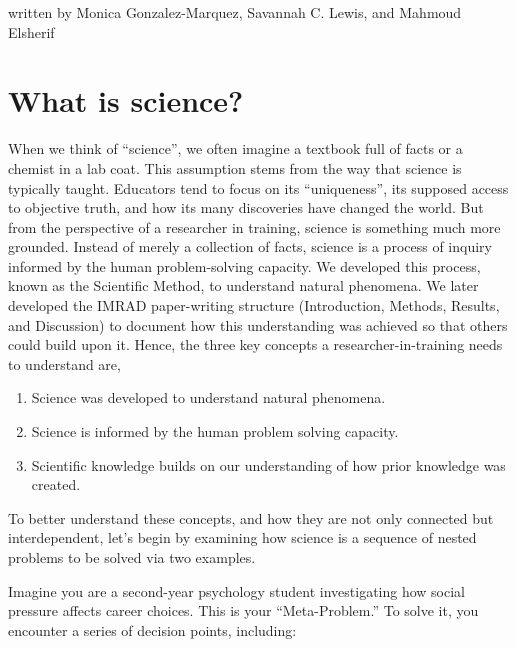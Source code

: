 \documentclass[
  letterpaper,
]{book}
\providecommand{\tightlist}{%
  \setlength{\itemsep}{0pt}\setlength{\parskip}{0pt}}\usepackage{longtable,booktabs,array}
\begin{document}
{written by Monica Gonzalez-Marquez, Savannah C. Lewis, and Mahmoud
Elsherif}

\section*{What is science?}\label{what-is-science}


When we think of ``science'', we often imagine a textbook full of facts
or a chemist in a lab coat. This assumption stems from the way that
science is typically taught. Educators tend to focus on its
``uniqueness'', its supposed access to objective truth, and how its many
discoveries have changed the world. But from the perspective of a
researcher in training, science is something much more grounded. Instead
of merely a collection of facts, science is a process of inquiry
informed by the human problem-solving capacity. We developed this
process, known as the Scientific Method, to understand natural
phenomena. We later developed the IMRAD paper-writing structure
(Introduction, Methods, Results, and Discussion) to document how this
understanding was achieved so that others could build upon it. Hence,
the three key concepts a researcher-in-training needs to understand are,

\begin{enumerate}
\def\labelenumi{\arabic{enumi}.}
\tightlist
\item
  Science was developed to understand natural phenomena.
\item
  Science is informed by the human problem solving capacity.
\item
  Scientific knowledge builds on our understanding of how prior
  knowledge was created.
\end{enumerate}

To better understand these concepts, and how they are not only connected
but interdependent, let's begin by examining how science is a sequence
of nested problems to be solved via two examples.

Imagine you are a second-year psychology student investigating how
social pressure affects career choices. This is your ``Meta-Problem.''
To solve it, you encounter a series of decision points, including:
\end{document}

